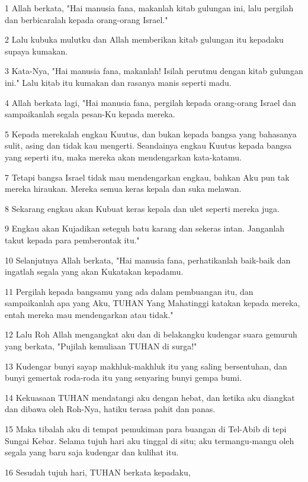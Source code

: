 \par 1 Allah berkata, "Hai manusia fana, makanlah kitab gulungan ini, lalu pergilah dan berbicaralah kepada orang-orang Israel."
\par 2 Lalu kubuka mulutku dan Allah memberikan kitab gulungan itu kepadaku supaya kumakan.
\par 3 Kata-Nya, "Hai manusia fana, makanlah! Isilah perutmu dengan kitab gulungan ini." Lalu kitab itu kumakan dan rasanya manis seperti madu.
\par 4 Allah berkata lagi, "Hai manusia fana, pergilah kepada orang-orang Israel dan sampaikanlah segala pesan-Ku kepada mereka.
\par 5 Kepada merekalah engkau Kuutus, dan bukan kepada bangsa yang bahasanya sulit, asing dan tidak kau mengerti. Seandainya engkau Kuutus kepada bangsa yang seperti itu, maka mereka akan mendengarkan kata-katamu.
\par 7 Tetapi bangsa Israel tidak mau mendengarkan engkau, bahkan Aku pun tak mereka hiraukan. Mereka semua keras kepala dan suka melawan.
\par 8 Sekarang engkau akan Kubuat keras kepala dan ulet seperti mereka juga.
\par 9 Engkau akan Kujadikan seteguh batu karang dan sekeras intan. Janganlah takut kepada para pemberontak itu."
\par 10 Selanjutnya Allah berkata, "Hai manusia fana, perhatikanlah baik-baik dan ingatlah segala yang akan Kukatakan kepadamu.
\par 11 Pergilah kepada bangsamu yang ada dalam pembuangan itu, dan sampaikanlah apa yang Aku, TUHAN Yang Mahatinggi katakan kepada mereka, entah mereka mau mendengarkan atau tidak."
\par 12 Lalu Roh Allah mengangkat aku dan di belakangku kudengar suara gemuruh yang berkata, "Pujilah kemuliaan TUHAN di surga!"
\par 13 Kudengar bunyi sayap makhluk-makhluk itu yang saling bersentuhan, dan bunyi gemertak roda-roda itu yang senyaring bunyi gempa bumi.
\par 14 Kekuasaan TUHAN mendatangi aku dengan hebat, dan ketika aku diangkat dan dibawa oleh Roh-Nya, hatiku terasa pahit dan panas.
\par 15 Maka tibalah aku di tempat pemukiman para buangan di Tel-Abib di tepi Sungai Kebar. Selama tujuh hari aku tinggal di situ; aku termangu-mangu oleh segala yang baru saja kudengar dan kulihat itu.
\par 16 Sesudah tujuh hari, TUHAN berkata kepadaku,
